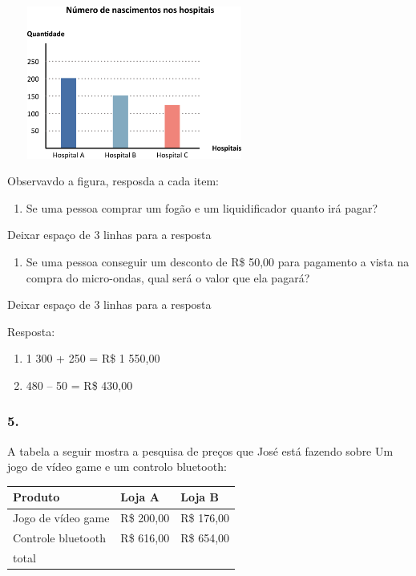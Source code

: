 \includegraphics[width=3.30029in,height=1.97517in]{media/image75.png}

Observavdo a figura, resposda a cada item:

\begin{enumerate}
\def\labelenumi{\alph{enumi})}
\item
  Se uma pessoa comprar um fogão e um liquidificador quanto irá pagar?
\end{enumerate}

Deixar espaço de 3 linhas para a resposta

\begin{enumerate}
\def\labelenumi{\alph{enumi})}
\item
  Se uma pessoa conseguir um desconto de R\$ 50,00 para pagamento a
  vista na compra do micro-ondas, qual será o valor que ela pagará?
\end{enumerate}

Deixar espaço de 3 linhas para a resposta

Resposta:

\begin{enumerate}
\def\labelenumi{\alph{enumi})}
\item
  1 300 + 250 = R\$ 1 550,00
\item
  480 -- 50 = R\$ 430,00
\end{enumerate}

\subsubsection{5.}\label{section-84}

A tabela a seguir mostra a pesquisa de preços que José está fazendo
sobre Um jogo de vídeo game e um controlo bluetooth:

\begin{longtable}[]{@{}lll@{}}
\toprule
Produto & Loja A & Loja B\tabularnewline
\midrule
\endhead
Jogo de vídeo game & R\$ 200,00 & R\$ 176,00\tabularnewline
Controle bluetooth & R\$ 616,00 & R\$ 654,00\tabularnewline
total & &\tabularnewline
\bottomrule
\end{longtable}

